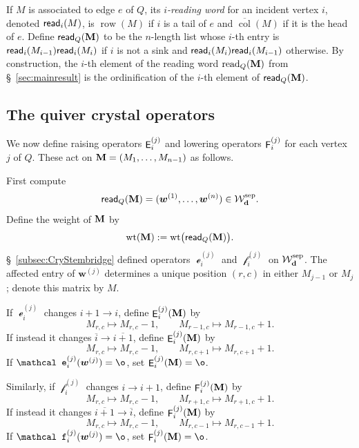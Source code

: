 \documentclass[12pt]{amsart}
\newcommand{\bs}{\boldsymbol}
\DeclareMathOperator{\worde}{{\mathcal e}}
\DeclareMathOperator{\wordf}{{\mathcal f}}
\DeclareMathOperator{\mate}{\sf E}
\DeclareMathOperator{\matf}{\sf F}
\theoremstyle{definition}
\theoremstyle{remark}
\newcommand{\barindex}[1]{\overline{#1}}
\begin{document}
If $M$ is associated to edge $e$ of $Q$, its \emph{$i$-reading word} for an incident vertex $i$,
denoted ${\sf{read}}_i(M)$,
 is $\operatorname{row}(M)$ if $i$ is a tail of $e$ and 
$\overline{\operatorname{col}}(M)$ if it is the head of $e$. Define ${\sf{read}}_Q({\bf M})$
to be the $n$-length list whose $i$-th entry is ${\sf read}_i(M_{i-1}){\sf read}_i(M_i)$
if $i$ is not a sink and ${\sf read}_i(M_{i}){\sf read}_i(M_{i-1})$ otherwise. By construction,
the $i$-th element of the reading word $\operatorname{read}_Q({\bf M})$
from \S~\ref{sec:mainresult} is the ordinification of the $i$-th element of ${\sf read}_Q({\bf M})$. 


\subsection{The quiver crystal operators} \label{sec:ordbimoves}

We now define raising operators $\mate_i^{(j)}$ and lowering operators $\matf_i^{(j)}$ for each vertex $j$ of $Q$.
These act on ${\bf M}=(M_1,\ldots,M_{n-1})$ as follows.

First compute
\[
{\sf read}_Q({\bf M})
=
({\bs w}^{(1)},\ldots,{\bs w}^{(n)})
\in {\mathcal W}_{\bf d}^{\operatorname{sep}}.
\]
Define the weight of ${\bf M}$ by
\begin{equation}\label{eqn:Admwtdef}
\operatorname{wt}({\bf M}):=\operatorname{wt}\bigl({\sf read}_Q({\bf M})\bigr).
\end{equation}
\S~\ref{subsec:CryStembridge} defined operators
$\worde_i^{(j)}$ and $\wordf_i^{(j)}$ on ${\mathcal W}_{\bf d}^{\operatorname{sep}}$.
The affected entry of ${\bs w}^{(j)}$ determines a unique position $(r,c)$ in either
$M_{j-1}$ or $M_j$; denote this matrix by $M$.

If $\worde_i^{(j)}$ changes $i+1\to i$, define $\mate_i^{(j)}({\bf M})$
by
\[
M_{r,c}\mapsto M_{r,c}-1,
\qquad
M_{r-1,c}\mapsto M_{r-1,c}+1.
\]
If instead it changes $\barindex{i}\to\barindex{i+1}$, define
$\mate_i^{(j)}({\bf M})$ by
\[
M_{r,c}\mapsto M_{r,c}-1,
\qquad
M_{r,c+1}\mapsto M_{r,c+1}+1.
\]
If $\worde_i^{(j)}({\bs w}^{(j)})=\o$, set
$\mate_i^{(j)}({\bf M})=\o$.

Similarly, if $\wordf_i^{(j)}$ changes $i\to i+1$, define
$\matf_i^{(j)}({\bf M})$ by
\[
M_{r,c}\mapsto M_{r,c}-1,
\qquad
M_{r+1,c}\mapsto M_{r+1,c}+1.
\]
If instead it changes $\barindex{i+1}\to\barindex{i}$, define
$\matf_i^{(j)}({\bf M})$ by
\[
M_{r,c}\mapsto M_{r,c}-1,
\qquad
M_{r,c-1}\mapsto M_{r,c-1}+1.
\]
If $\wordf_i^{(j)}({\bs w}^{(j)})=\o$, set
$\matf_i^{(j)}({\bf M})=\o$.
\end{document}

